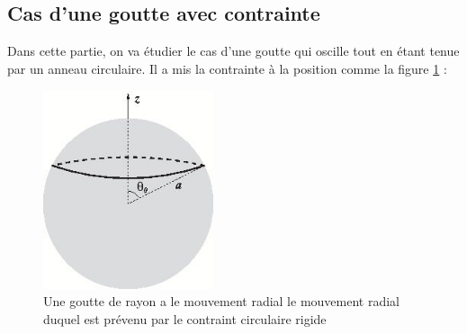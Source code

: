 \documentclass[a4paper]{report}
\begin{document}
\newpage
\subsection{Cas d'une goutte avec contrainte}
Dans cette partie, on va étudier le cas d'une goutte qui oscille tout en étant tenue par un anneau circulaire. Il a mis la contrainte à la position comme la figure \ref{2_3_2_prosperetti} :






\begin{figure}[h!] 
\begin{center}
\includegraphics[width=5cm]{2_3_2_prosperetti}
\caption{Une goutte de rayon a le mouvement radial le mouvement radial duquel est prévenu par le contraint circulaire rigide}
\label{2_3_2_prosperetti}
\end{center}
\end{figure}
\end{document}
